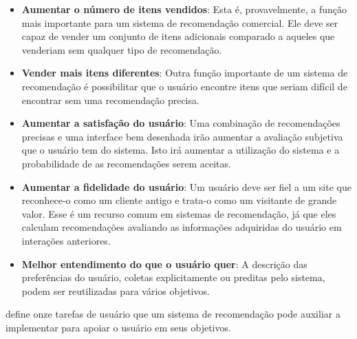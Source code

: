 \begin{itemize}
	\item{\textbf{Aumentar o número de itens vendidos}: Esta é, provavelmente, a função mais importante para um sistema de recomendação comercial. Ele deve ser capaz de vender um conjunto de itens adicionais comparado a aqueles que venderiam sem qualquer tipo de recomendação.}
	
	\item{\textbf{Vender mais itens diferentes}: Outra função importante de um sistema de recomendação é possibilitar que o usuário encontre itens que seriam difícil de encontrar sem uma recomendação precisa.}
	
	\item{\textbf{Aumentar a satisfação do usuário}: Uma combinação de recomendações precisas e uma interface bem desenhada irão aumentar a avaliação subjetiva que o usuário tem do sistema. Isto irá aumentar a utilização do sistema e a probabilidade de as recomendações serem aceitas.}
	
	\item{\textbf{Aumentar a fidelidade do usuário}: Um usuário deve ser fiel a um site que reconhece-o como um cliente antigo e trata-o como um visitante de grande valor. Esse é um recurso comum em sistemas de recomendação, já que eles calculam recomendações avaliando as informações adquiridas do usuário em interações anteriores.}
	
	\item{\textbf{Melhor entendimento do que o usuário quer}: A descrição das preferências do usuário, coletas explicitamente ou preditas pelo sistema, podem ser reutilizadas para vários objetivos.}		
\end{itemize}

\cite{Herlocker:2004:ECF:963770.963772} define onze tarefas de usuário que um sistema de recomendação pode auxiliar a implementar para apoiar o usuário em seus objetivos.

